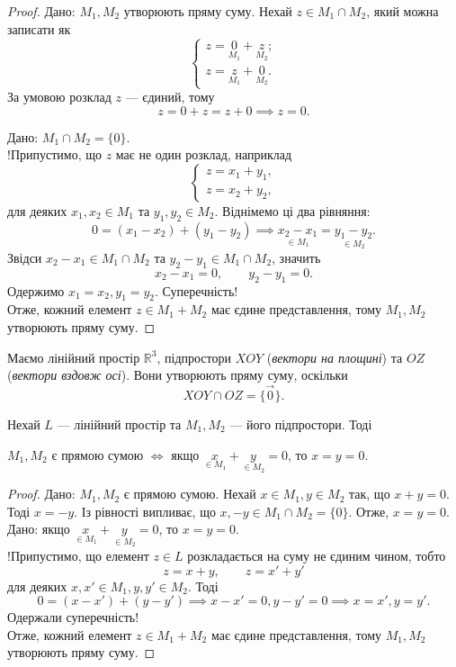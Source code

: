 \documentclass{math_library}
\begin{document}
	\begin{proof}
	\rightproof Дано: $M_1, M_2$ утворюють пряму суму. Нехай $z \in M_1 \cap M_2$, який можна записати як
	\[
	\begin{cases} z = \underset{M_1}{0} + \underset{M_2}{z}; \\ z = \underset{M_1}{z} + \underset{M_2}{0}. \end{cases}
	\]
	За умовою розклад $z$ --- єдиний, тому 
	\[
	z=0+z=z+0 \implies z = 0.
	\]
	
	\leftproof Дано: $M_1 \cap M_2 = \{0\}$.\\
	!Припустимо, що $z$ має не один розклад, наприклад 
	\[
	\begin{cases} z = x_1 + y_1, \\ z = x_2 + y_2, \end{cases}
	\]
	для деяких $x_1,x_2 \in M_1$ та $y_1,y_2 \in M_2$. Віднімемо ці два рівняння:
	\[
	0 = (x_1-x_2) + (y_1-y_2) \implies \underset{\in M_1}{x_2-x_1}=\underset{\in M_2}{y_1-y_2}.
	\]
	Звідси $x_2-x_1 \in M_1 \cap M_2$ та $y_2 - y_1 \in M_1 \cap M_2$, значить
	\[
	x_2 - x_1 = 0, \qquad y_2 - y_1 = 0.
	\]
	Одержимо $x_1 = x_2, y_1 = y_2$. Суперечність! \\
	Отже, кожний елемент $z \in M_1+M_2$ має єдине представлення, тому $M_1,M_2$ утворюють пряму суму.
	\end{proof}
	
	\begin{example}
	Маємо лінійний простір $\mathbb{R}^3$, підпростори $XOY$ (\textit{вектори на площині}) та $OZ$ (\textit{вектори вздовж осі}). Вони утворюють пряму суму, оскільки 
	\[
	XOY \cap OZ = \{\vec{0}\}.
	\]
	\end{example}
	
	\begin{proposition}
	Нехай $L$ --- лінійний простір та $M_1, M_2$ --- його підпростори. Тоді
	\begin{center}
	$M_1,M_2$ є прямою сумою $\iff$ якщо $\underset{\in M_1}{x}+\underset{\in M_2}{y} = 0$, то $x=y=0$.
	\end{center}
	\end{proposition}
	
	\begin{proof}
	\rightproof Дано: $M_1,M_2$ є прямою сумою. Нехай $x \in M_1, y \in M_2$ так, що $x + y = 0$. Тоді $x = -y$. Із рівності випливає, що $x,-y \in M_1 \cap M_2 = \{0\}$. Отже, $x = y = 0$.
	\bigskip \\
	\leftproof Дано: якщо $\underset{\in M_1}{x}+\underset{\in M_2}{y} = 0$, то $x=y=0$.\\
	!Припустимо, що елемент $z \in L$ розкладається на суму не єдиним чином, тобто
	\[
		z = x+y, \qquad z = x'+y'
	\]
	для деяких $x,x' \in M_1, y,y' \in M_2$. Тоді
	\[
	0 = (x-x') + (y-y') \implies x-x'=0, y-y'=0 \implies x=x', y=y'.
	\]
	Одержали суперечність!\\
	Отже, кожний елемент $z \in M_1+M_2$ має єдине представлення, тому $M_1,M_2$ утворюють пряму суму.
	\end{proof}
	
\end{document}
